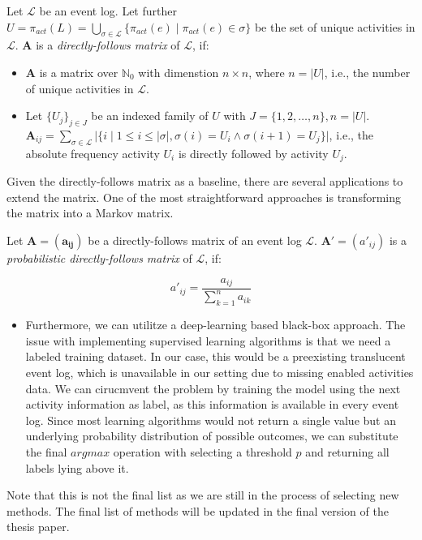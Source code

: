 \begin{definition}
    Let $\mathcal{L}$ be an event log. Let further $U = \pi_{act}(L) = \bigcup\limits_{\sigma \in \mathcal{L}} \{ \pi_{act}(e) \mid \pi_{act}(e) \in \sigma \}$ be the set of unique activities in $\mathcal{L}$. $\mathbf{A}$ is a \emph{directly-follows matrix} of $\mathcal{L}$, if:

    \begin{itemize}
        \item $\mathbf{A}$ is a matrix over $\mathbb{N}_0$ with dimenstion $n \times n$, where $n = \lvert U \rvert$, i.e., the number of unique activities in $\mathcal{L}$.
        
        \item Let $\{ U_j \}_{j \in J}$ be an indexed family of $U$ with $J = \{ 1, 2, \dots, n\}, n = \lvert U \rvert$. $\mathbf{A}_{ij} = \sum\limits_{\sigma \in \mathcal{L}} \Big| \{ i \mid 1 \leq i \leq \lvert \sigma \rvert, \sigma(i) = U_i \land \sigma(i+1) = U_j \} \Big|$, i.e., the absolute frequency activity $U_i$ is directly followed by activity $U_j$.
    \end{itemize}
\end{definition}

Given the directly-follows matrix as a baseline, there are several applications to extend the matrix. One of the most straightforward approaches is transforming the matrix into a Markov matrix.

\begin{definition}
    Let $\mathbf{A = (a_{ij})}$ be a directly-follows matrix of an event log $\mathcal{L}$. $\mathbf{A'} = (a'_{ij})$ is a \emph{probabilistic directly-follows matrix} of $\mathcal{L}$, if:

    \[
        a'_{ij} = \frac{a_{ij}}{\sum\limits_{k=1}^{n} a_{ik}}
    \]
\end{definition}



\begin{itemize}
    
    \item Furthermore, we can utilitze a deep-learning based black-box approach. The issue with implementing supervised learning algorithms is that we need a labeled training dataset. In our case, this would be a preexisting translucent event log, which is unavailable in our setting due to missing enabled activities data. We can cirucmvent the problem by training the model using the next activity information as label, as this information is available in every event log. Since most learning algorithms would not return a single value but an underlying probability distribution of possible outcomes, we can substitute the final $\mathit{argmax}$ operation with selecting a threshold $p$ and returning all labels lying above it.
\end{itemize}

Note that this is not the final list as we are still in the process of selecting new methods. The final list of methods will be updated in the final version of the thesis paper.



